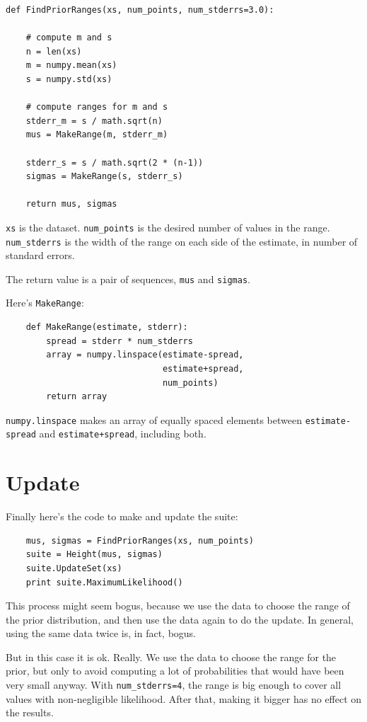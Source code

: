 \documentclass[12pt]{book}
\begin{document}
\begin{verbatim}
def FindPriorRanges(xs, num_points, num_stderrs=3.0):

    # compute m and s
    n = len(xs)
    m = numpy.mean(xs)
    s = numpy.std(xs)

    # compute ranges for m and s
    stderr_m = s / math.sqrt(n)
    mus = MakeRange(m, stderr_m)

    stderr_s = s / math.sqrt(2 * (n-1))
    sigmas = MakeRange(s, stderr_s)

    return mus, sigmas
\end{verbatim}

{\tt xs} is the dataset.  \verb"num_points" is the desired number of
values in the range.  \verb"num_stderrs" is the width of the range on
each side of the estimate, in number of standard errors.

The return
value is a pair of sequences, {\tt mus} and {\tt sigmas}.

Here's {\tt MakeRange}:

\begin{verbatim}
    def MakeRange(estimate, stderr):
        spread = stderr * num_stderrs
        array = numpy.linspace(estimate-spread,
                               estimate+spread,
                               num_points)
        return array
\end{verbatim}

{\tt numpy.linspace} makes an array of equally spaced elements between
{\tt estimate-spread} and {\tt estimate+spread}, including both.


\section{Update}

Finally here's the code to make and update the suite:

\begin{verbatim}
    mus, sigmas = FindPriorRanges(xs, num_points)
    suite = Height(mus, sigmas)
    suite.UpdateSet(xs)
    print suite.MaximumLikelihood()    
\end{verbatim}

This process might seem bogus, because we use the data to choose the
range of the prior distribution, and then use the data again to do the
update.  In general, using the same data twice is, in fact, bogus.

But in this case it is ok.  Really.  We use the data to choose the
range for the prior, but only to avoid computing a lot of
probabilities that would have been very small anyway.  With
\verb"num_stderrs=4", the range is big enough to cover all values with
non-negligible likelihood.  After that, making it bigger has no effect
on the results.
\end{document}
